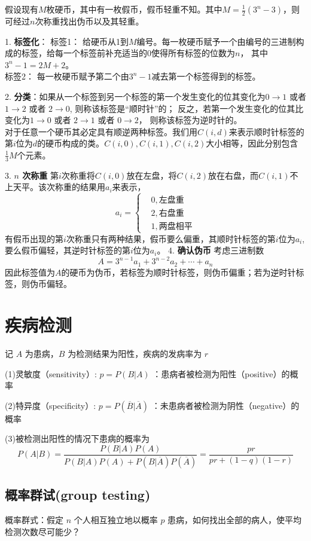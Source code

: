 \documentclass[10t, a4paper, oneside]{ctexbook}
\begin{document}
假设现有$M$枚硬币，其中有一枚假币，假币轻重不知。其中$M = \frac{1}{2}(3^n - 3)$，则可经过$n$次称重找出伪币以及其轻重。

1. \textbf{标签化}：
标签1： 给硬币从1到$M$编号。每一枚硬币赋予一个由编号的三进制构成的标签，给每一个标签前补充适当的$0$使得所有标签的位数为$n$， 其中$3^n - 1 = 2M+ 2$。\\
标签2： 每一枚硬币赋予第二个由$3^n - 1$减去第一个标签得到的标签。

2. \textbf{分类}：如果从一个标签到另一个标签的第一个发生变化的位其变化为$0\rightarrow1$ 或者 $1\rightarrow2$ 或者 $2\rightarrow 0$,  则称该标签是“顺时针”的；
反之，若第一个发生变化的位其比变化为$1 \rightarrow 0$ 或者 $2\rightarrow 1$ 或者 $0 \rightarrow 2$， 则称该标签为逆时针的。\\
对于任意一个硬币其必定具有顺逆两种标签。我们用$C(i,d)$来表示顺时针标签的第$i$位为$d$的硬币构成的类。$C(i,0),C(i,1),C(i,2)$大小相等，因此分别包含$\frac{1}{3}M$个元素。

3. \textbf{$n$ 次称重}
第$i$次称重将$C(i,0)$放在左盘，将$C(i,2)$放在右盘，而$C(i,1)$不上天平。该次称重的结果用$a_i$来表示，
$$a_i = \begin{cases}&0,\text{左盘重}\\&2,\text{右盘重}\\&1,\text{两盘相平}\end{cases}$$
有假币出现的第$i$次称重只有两种结果，假币要么偏重，其顺时针标签的第$i$位为$a_i$,要么假币偏轻，其逆时针标签的第$i$位为$a_i$。
4. \textbf{确认伪币}
考虑三进制数
$$A = 3^{n-1}a_1 + 3^{n-2}a_2 + \cdots +a_n$$
因此标签值为$A$的硬币为伪币，若标签为顺时针标签，则伪币偏重；若为逆时针标签，则伪币偏轻。


\section{疾病检测}
\noindent{}
记 $A$ 为患病，$B$ 为检测结果为阳性，疾病的发病率为 $r$

(1)灵敏度（sensitivity）: $p=P(B|A)$ ：患病者被检测为阳性（positive）的概率

(2)特异度（specificity）: $p=P(\overline{B}|\overline{A})$ ：未患病者被检测为阴性（negative）的概率

(3)被检测出阳性的情况下患病的概率为
$$
P(A|B)=\frac{P(B|A)P(A)}{P(B|A)P(A)+P(B|\overline{A})P(\overline{A})}=\frac{pr}{pr+(1-q)(1-r)}
$$
\subsection{概率群试(group testing)}
概率群式：假定 $n$ 个人相互独立地以概率 $p$ 患病，如何找出全部的病人，使平均检测次数尽可能少？
\end{document}
